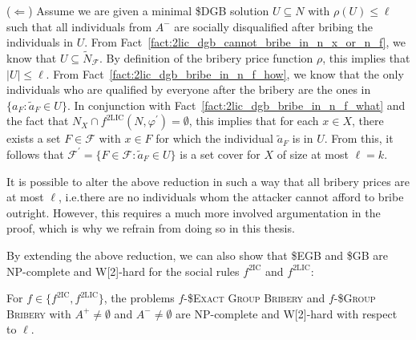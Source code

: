 \documentclass[
    12pt,               %
    a4paper,            %
    bibtotoc,           %
    pointlessnumbers,   %
    ngerman,            %
    titlepage,          %
    leqno,              %
    ]{scrarticle}       %
\newcommand\factref{Fact~\ref}
\begin{document}
\begin{Proof}
($\Leftarrow$) Assume we are given a minimal \$DGB solution $U \subseteq N$ with $\rho(U) \leq \ell$ such that all individuals from $A^-$ are socially disqualified after bribing the individuals in $U$. From \factref{fact:2lic_dgb_cannot_bribe_in_n_x_or_n_f}, we know that $U \subseteq \tilde{N}_\mathcal{F}$. By definition of the bribery price function $\rho$, this implies that $|U| \leq \ell$. From \factref{fact:2lic_dgb_bribe_in_n_f_how}, we know that the only individuals who are qualified by everyone after the bribery are the ones in $\{ a_F : \tilde{a}_F \in U \}$. In conjunction with \factref{fact:2lic_dgb_bribe_in_n_f_what} and the fact that $N_X \cap f^{\text{2LIC}}(N, \varphi^\prime) = \emptyset$, this implies that for each $x \in X$, there exists a set $F \in \mathcal{F}$ with $x \in F$ for which the individual $\tilde{a}_F$ is in $U$. From this, it follows that $\mathcal{F}^\prime = \{ F \in \mathcal{F} : \tilde{a}_F \in U \}$ is a set cover for $X$ of size at most $\ell = k$.
\end{Proof}



It is possible to alter the above reduction in such a way that all bribery prices are at most $\ell$, i.e.\@ there are no individuals whom the attacker cannot afford to bribe outright. However, this requires a much more involved argumentation in the proof, which is why we refrain from doing so in this thesis.



By extending the above reduction, we can also show that \$EGB and \$GB are NP-complete and W[2]-hard for the social rules $f^{\text{2IC}}$ and $f^{\text{2LIC}}$:

\begin{Corollary} \label{cor:2ic_egb_gb_npc}
For $f \in \{ f^{\text{2IC}}, f^{\text{2LIC}} \}$, the problems $f$-\textsc{\$Exact Group Bribery} and $f$-\textsc{\$Group Bribery} with $A^+ \neq \emptyset$ and $A^- \neq \emptyset$ are NP-complete and W[2]-hard with respect to $\ell$.
\end{Corollary}
\end{document}

